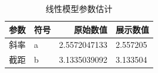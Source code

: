 \begin{table}[H]
\centering
\caption{线性模型参数估计}
\label{tab:parameters}
\begin{tabular}{llrl}
\toprule
参数 & 符号 & 原始数值 & 展示数值 \\
\midrule
斜率 & a & 2.5572047133 & 2.557205 \\
截距 & b & 3.1335039092 & 3.133504 \\
\bottomrule
\end{tabular}
\end{table}
